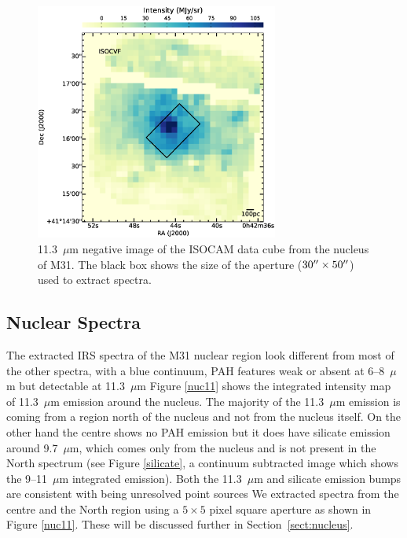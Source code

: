 \begin{figure}
\centering
\includegraphics[width = 8cm]{./isonuc.eps}
\caption{11.3~$\mu$m negative image of the ISOCAM data cube from the nucleus of M31. 
The black box shows the size of the aperture ($30\hbox{$^{\prime\prime}$}\times50\hbox{$^{\prime\prime}$}$) used to extract spectra.}
\label{isonuc}
\end{figure}

\subsection{Nuclear Spectra}
\label{obs:nuc}

The extracted IRS spectra of the M31 nuclear region look different from most of the other spectra, with
a blue continuum, PAH features weak or absent at 6--8~$\mu$m  but detectable at 11.3~$\mu$m
Figure \ref{nuc11} shows the integrated intensity map of 11.3~$\mu$m emission around the nucleus. The majority of the 11.3~$\mu$m 
emission is coming from a region north of the nucleus and not from the nucleus itself. 
On the other hand the centre shows no PAH emission  but it does have silicate emission around 9.7~$\mu$m, 
which comes only from the nucleus and is not present in the North spectrum 
(see Figure \ref{silicate}, a continuum subtracted image which shows the 9--11~$\mu$m integrated emission).
Both the 11.3~$\mu$m  and silicate emission bumps are consistent with being unresolved point sources %
We extracted spectra from the centre and the North region using a $5 \times 5$ pixel %
square aperture as shown in Figure \ref{nuc11}. These will be discussed further in Section~\ref{sect:nucleus}.


